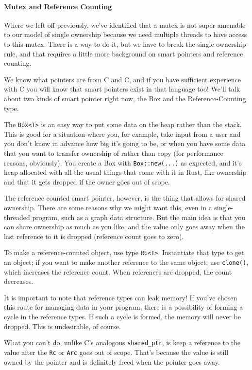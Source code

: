 \documentclass[a4paper]{report}
\newcommand{\CPP}{C\nolinebreak\hspace{-.05em}\raisebox{.4ex}{\tiny\bf +}\nolinebreak\hspace{-.10em}\raisebox{.4ex}{\tiny\bf +}}
\def\CPP{{C\nolinebreak[4]\hspace{-.05em}\raisebox{.4ex}{\tiny\bf ++}}}
\begin{document}
\paragraph{Mutex and Reference Counting}

Where we left off previously, we've identified that a mutex is not super amenable to our model of single ownership because we need multiple threads to have access to this mutex. There is a way to do it, but we have to break the single ownership rule, and that requires a little more background on smart pointers and reference counting.

We know what pointers are from C and \CPP, and if you have sufficient experience with \CPP{ }you will know that smart pointers exist in that language too! We'll talk about two kinds of smart pointer right now, the Box and the Reference-Counting type.

The \texttt{Box<T>} is an easy way to put some data on the heap rather than the stack. This is good for a situation where you, for example, take input from a user and you don't know in advance how big it's going to be, or when you have some data that you want to transfer ownership of rather than copy (for performance reasons, obviously). You create a Box with \texttt{Box::new(...)} as expected, and it's heap allocated with all the usual things that come with it in Rust, like ownership and that it gets dropped if the owner goes out of scope.

The reference counted smart pointer, however, is the thing that allows for shared ownership. There are some reasons why we might want this, even in a single-threaded program, such as a graph data structure. But the main idea is that you can share ownership as much as you like, and the value only goes away when the last reference to it is dropped (reference count goes to zero). 

To make a reference-counted object, use type \texttt{Rc<T>}. Instantiate that type to get an object; if you want to make another reference to the same object, use \texttt{clone()}, which increases the reference count. When references are dropped, the count decreases.

It is important to note that reference types can leak memory! If you've chosen this route for managing data in your program, there is a possibility of forming a cycle in the reference types. If such a cycle is formed, the memory will never be dropped. This is undesirable, of course.

What you can't do, unlike \CPP's analogous \texttt{shared\_ptr}, is keep a reference to the value after the \texttt{Rc} or \texttt{Arc} goes out of scope. That's because the value is still owned by the pointer and is definitely freed when the pointer goes away.
\end{document}
